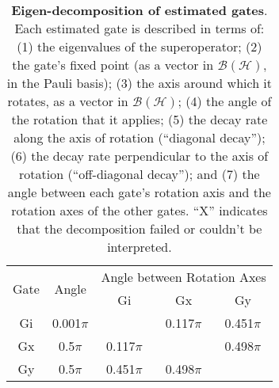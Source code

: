 \documentclass{article}[11pt]
\begin{document}
\begin{table}[h]
\begin{center}
\vspace{2em}
\begin{tabular}[l]{|c|c|c|c|c|}
\hline
\multirow{2}{*}{Gate} & \multirow{2}{*}{Angle} & \multicolumn{3}{c|}{Angle between Rotation Axes} \\ \cline{3-5}
 & & Gi & Gx & Gy \\ \hline
Gi & 0.001$\pi$ &  & 0.117$\pi$ & 0.451$\pi$ \\ \hline
Gx & 0.5$\pi$ & 0.117$\pi$ &  & 0.498$\pi$ \\ \hline
Gy & 0.5$\pi$ & 0.451$\pi$ & 0.498$\pi$ &  \\ \hline
\end{tabular}

\caption{\textbf{Eigen-decomposition of estimated gates}.  Each estimated gate is described in terms of: (1) the eigenvalues of the superoperator; (2) the gate's fixed point (as a vector in $\mathcal{B}(\mathcal{H})$, in the Pauli basis); (3)  the axis around which it rotates, as a vector in $\mathcal{B}(\mathcal{H})$; (4) the angle of the rotation that it applies; (5) the decay rate along the axis of rotation (``diagonal decay''); (6) the decay rate perpendicular to the axis of rotation (``off-diagonal decay''); and (7) the angle between each gate's rotation axis and the rotation axes of the other gates.  ``X'' indicates that the decomposition failed or couldn't be interpreted. \label{bestGatesetDecompTable}}
\end{center}
\end{table}


\end{document}
